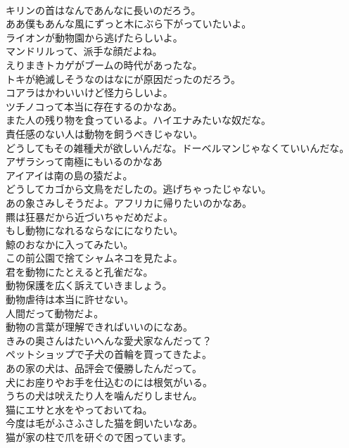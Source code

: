 \documentclass[8pt]{extreport}
\begin{document}
\begin{CJK}{UTF8}{min}
\\	キリンの首はなんであんなに長いのだろう。	
\\	ああ僕もあんな風にずっと木にぶら下がっていたいよ。	
\\	ライオンが動物園から逃げたらしいよ。	
\\	マンドリルって、派手な顔だよね。	
\\	えりまきトカゲがブームの時代があったな。	
\\	トキが絶滅しそうなのはなにが原因だったのだろう。	
\\	コアラはかわいいけど怪力らしいよ。	
\\	ツチノコって本当に存在するのかなあ。	
\\	また人の残り物を食っているよ。ハイエナみたいな奴だな。	
\\	責任感のない人は動物を飼うべきじゃない。	
\\	どうしてもその雑種犬が欲しいんだな。ドーベルマンじゃなくていいんだな。	
\\	アザラシって南極にもいるのかなあ	
\\	アイアイは南の島の猿だよ。	
\\	どうしてカゴから文鳥をだしたの。逃げちゃったじゃない。	
\\	あの象さみしそうだよ。アフリカに帰りたいのかなあ。	
\\	羆は狂暴だから近づいちゃだめだよ。	
\\	もし動物になれるならなにになりたい。	
\\	鯨のおなかに入ってみたい。	
\\	この前公園で捨てシャムネコを見たよ。	
\\	君を動物にたとえると孔雀だな。	
\\	動物保護を広く訴えていきましょう。	
\\	動物虐待は本当に許せない。	
\\	人間だって動物だよ。	
\\	動物の言葉が理解できればいいのになあ。	
\\	きみの奥さんはたいへんな愛犬家なんだって？	
\\	ペットショップで子犬の首輪を買ってきたよ。	
\\	あの家の犬は、品評会で優勝したんだって。	
\\	犬にお座りやお手を仕込むのには根気がいる。	
\\	うちの犬は吠えたり人を噛んだりしません。	
\\	猫にエサと水をやっておいてね。	
\\	今度は毛がふさふさした猫を飼いたいなあ。	
\\	猫が家の柱で爪を研ぐので困っています。	

\end{CJK}
\end{document}
